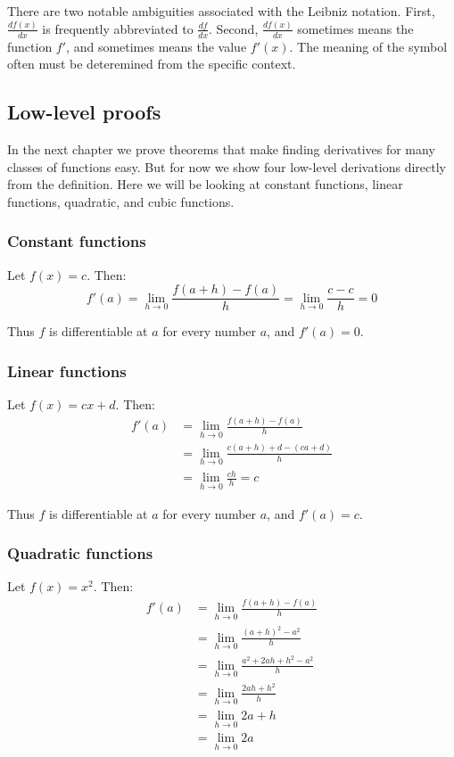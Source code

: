 \vs

There are two notable ambiguities associated with the Leibniz
notation. First, $\frac{df(x)}{dx}$ is frequently abbreviated to
$\frac{df}{dx}$. Second, $\frac{df(x)}{dx}$ sometimes means the
function $f'$, and sometimes means the value $f'(x)$. The meaning of
the symbol often must be deteremined from the specific context.

\subsection{Low-level proofs}

In the next chapter we prove theorems that make finding derivatives
for many classes of functions easy. But for now we show four low-level
derivations directly from the definition. Here we will be looking at
constant functions, linear functions, quadratic, and cubic functions.

\subsubsection*{Constant functions}
Let $f(x)=c$. Then:
\[f'(a)=\lim_{h\to0}\frac{f(a+h)-f(a)}{h}=\lim_{h\to0}\frac{c-c}{h}=0\]

Thus $f$ is differentiable at $a$ for every number $a$, and $f'(a)=0$.

\subsubsection*{Linear functions}
Let $f(x)=cx+d$. Then:
\begin{align*}
  f'(a)&=\lim_{h\to0}\frac{f(a+h)-f(a)}{h}\\
       &=\lim_{h\to0}\frac{c(a+h)+d-(ca+d)}{h}\\
       &=\lim_{h\to0}\frac{ch}{h}=c
\end{align*}

Thus $f$ is differentiable at $a$ for every number $a$, and $f'(a)=c$.

\subsubsection*{Quadratic functions}
Let $f(x)=x^2$. Then:
\begin{align*}
  f'(a)&=\lim_{h\to0}\frac{f(a+h)-f(a)}{h}\\
       &=\lim_{h\to0}\frac{(a+h)^2-a^2}{h}\\
       &=\lim_{h\to0}\frac{a^2+2ah+h^2-a^2}{h}\\
       &=\lim_{h\to0}\frac{2ah+h^2}{h}\\
       &=\lim_{h\to0}2a+h\\
       &=\lim_{h\to0}2a
\end{align*}

